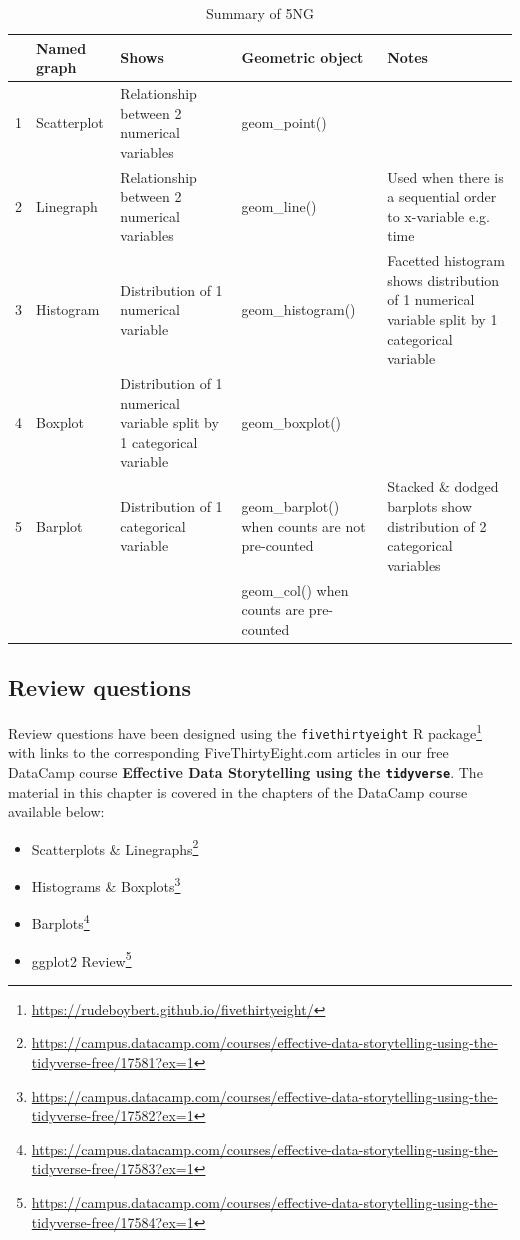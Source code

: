 \documentclass[12pt,]{krantz}
\providecommand{\tightlist}{%
  \setlength{\itemsep}{0pt}\setlength{\parskip}{0pt}}
\renewcommand{\href}[2]{#2\footnote{\url{#1}}}
\theoremstyle{definition}
\theoremstyle{definition}
\theoremstyle{definition}
\theoremstyle{remark}
\begin{document}
\begin{table}[H]

\caption{\label{tab:viz-summary-table}Summary of 5NG}
\centering
\fontsize{10}{12}\selectfont
\begin{tabular}[t]{rl>{\raggedright\arraybackslash}p{0.75in}>{\raggedright\arraybackslash}p{1.1in}>{\raggedright\arraybackslash}p{1.1in}}
\toprule
  & Named graph & Shows & Geometric object & Notes\\
\midrule
1 & Scatterplot & Relationship between 2 numerical variables & geom\_point() & \\
2 & Linegraph & Relationship between 2 numerical variables & geom\_line() & Used when there is a sequential order to x-variable e.g. time\\
3 & Histogram & Distribution of 1 numerical variable & geom\_histogram() & Facetted histogram shows distribution of 1 numerical variable split by 1 categorical variable\\
4 & Boxplot & Distribution of 1 numerical variable split by 1 categorical variable & geom\_boxplot() & \\
5 & Barplot & Distribution of 1 categorical variable & geom\_barplot() when counts are not pre-counted & Stacked \& dodged barplots show distribution of 2 categorical variables\\
 &  &  & geom\_col() when counts are pre-counted & \\
\bottomrule
\end{tabular}
\end{table}

\subsection{Review questions}\label{review-questions}

Review questions have been designed using the
\href{https://rudeboybert.github.io/fivethirtyeight/}{\texttt{fivethirtyeight}
R package} \citep{R-fivethirtyeight} with links to the corresponding
FiveThirtyEight.com articles in our free DataCamp course
\textbf{Effective Data Storytelling using the \texttt{tidyverse}}. The
material in this chapter is covered in the chapters of the DataCamp
course available below:

\begin{itemize}
\tightlist
\item
  \href{https://campus.datacamp.com/courses/effective-data-storytelling-using-the-tidyverse-free/17581?ex=1}{Scatterplots
  \& Linegraphs}
\item
  \href{https://campus.datacamp.com/courses/effective-data-storytelling-using-the-tidyverse-free/17582?ex=1}{Histograms
  \& Boxplots}
\item
  \href{https://campus.datacamp.com/courses/effective-data-storytelling-using-the-tidyverse-free/17583?ex=1}{Barplots}
\item
  \href{https://campus.datacamp.com/courses/effective-data-storytelling-using-the-tidyverse-free/17584?ex=1}{ggplot2
  Review}
\end{itemize}
\end{document}
